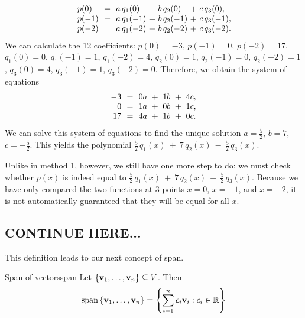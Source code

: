 \begin{solution}
\begin{itemize}
    \begin{equation*}
      \begin{array}{l@{~~}l@{~~}l@{\,}l@{~}l@{~}l@{\,}l@{~}l@{~}l@{\,}l@{~}l}
        p(0)  &=& a&q_1(0)  &+& b&q_2(0)  &+& c&q_3(0), \\
        p(-1) &=& a&q_1(-1) &+& b&q_2(-1) &+& c&q_3(-1), \\
        p(-2) &=& a&q_1(-2) &+& b&q_2(-2) &+& c&q_3(-2). \\
      \end{array}
    \end{equation*}
    We can calculate the 12 coefficients: $p(0)=-3$, $p(-1)=0$,
    $p(-2)=17$, $q_1(0)=0$, $q_1(-1)=1$, $q_1(-2)=4$, $q_2(0)=1$,
    $q_2(-1)=0$, $q_2(-2)=1$, $q_3(0)=4$, $q_3(-1)=1$, $q_3(-2)=0$.
    Therefore, we obtain the system of equations
    \begin{equation*}
      \begin{array}{r@{~~}c@{~~}l}
        -3  &=& 0a ~+~ 1b ~+~ 4c, \\
        0   &=& 1a ~+~ 0b ~+~ 1c, \\
        17  &=& 4a ~+~ 1b ~+~ 0c.
      \end{array}
    \end{equation*}
    We can solve this system of equations to find the unique solution
    $a=\frac{5}{2}$, $b=7$, $c=-\frac{5}{2}$. This yields the
    polynomial $\frac{5}{2}\,q_1(x) ~+~ 7\,q_2(x) ~-~
    \frac{5}{2}\,q_3(x)$.

    Unlike in method 1, however, we still have one more step to do: we
    must check whether $p(x)$ is indeed equal to
    $\frac{5}{2}\,q_1(x) ~+~ 7\,q_2(x) ~-~ \frac{5}{2}\,q_3(x)$.
    Because we have only compared the two functions at 3 points $x=0$,
    $x=-1$, and $x=-2$, it is not automatically guaranteed that they
    will be equal for all $x$.
  \end{itemize}
\end{solution}

\subsection*{CONTINUE HERE...}

This definition leads to our next concept of span.

\begin{definition}{Span of vectors}{span}
  Let $\left\{\mbox{\bf v}_{1},\ldots,\mbox{\bf v}_{n}\right\} \subseteq V$.
  Then
  \begin{equation*} \sspan\set{\vect{v}_{1},\ldots,\vect{v}_{n}} =
    \set{\sum_{i=1}^{n}c_{i}\vect{v}_{i}: c_{i}\in \R }
  \end{equation*}
\end{definition}

